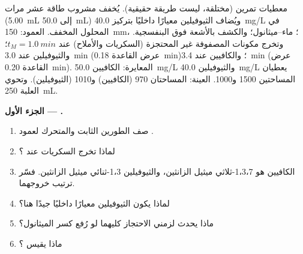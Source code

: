 \begin{problem}
\label{pb:b2:chromatography:1}
معطيات تمرين (مختلقة، ليست طريقة حقيقية). يُخفف مشروب طاقة عشر مرات (\qty{5.00}{mL} إلى
\qty{50.0}{mL}) ويُضاف الثيوفيلين معيارًا داخليًا بتركيز \qty{40.0}{mg/L} في المحلول
المخفف. العمود: \qty{150}{mm}، ؛  ماء--ميثانول؛ والكشف بالأشعة فوق البنفسجية.
وتخرج مكونات المصفوفة غير المحتجزة (السكريات والأملاح) عند $t_M = \qty{1.0}{min}$؛ والثيوفيلين عند
\qty{3.0}{min} (عرض القاعدة \qty{0.18}{min})؛ والكافيين عند \qty{3.4}{min} (عرض القاعدة \qty{0.20}{min}).
المعايرة: الكافيين \qty{50.0}{mg/L} والثيوفيلين \qty{40.0}{mg/L} يعطيان المساحتين 1500 و1000.
العينة: المساحتان 970 (الكافيين) و1010 (الثيوفيلين). وتحوي العلبة \qty{250}{mL}.

\begin{center}
\end{center}

\medskip
\noindent\textbf{الجزء الأول --- .}
\begin{enumerate}
  \item صف الطورين الثابت والمتحرك لعمود .
  \item لماذا تخرج السكريات عند ؟
  \item الكافيين هو 1،3،7-ثلاثي ميثيل الزانثين، والثيوفيلين 1،3-ثنائي ميثيل الزانثين. فسّر ترتيب
        خروجهما.
  \item لماذا يكون الثيوفيلين معيارًا داخليًا جيدًا هنا؟
  \item ماذا يحدث لزمني الاحتجاز كليهما لو رُفع كسر الميثانول؟
  \item ماذا يقيس ؟
\end{enumerate}


\end{problem}
